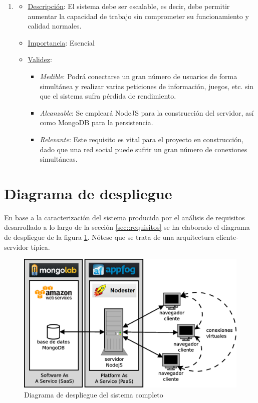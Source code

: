 \begin{enumerate}
\item %
  \begin{itemize}
  \item \underline{Descripción}: El sistema debe ser escalable, es decir, debe permitir aumentar la capacidad de trabajo sin comprometer su funcionamiento y calidad normales. 
  \item \underline{Importancia}: Esencial
  \item \underline{Validez}:
    \begin{itemize}
    \item \textit{Medible}: Podrá conectarse un gran número de usuarios de forma simultánea y realizar varias peticiones de información, juegos, etc. sin que el sistema sufra pérdida de rendimiento.
    \item \textit{Alcanzable}: Se empleará NodeJS para la construcción del servidor, así como MongoDB para la persistencia.
    \item \textit{Relevante}: Este requisito es vital para el proyecto en construcción, dado que una red social puede sufrir un gran número de conexiones simultáneas.
    \end{itemize}
  \end{itemize}

\end{enumerate}



\section{Diagrama de despliegue}
\label{sec::despliegue}

En base a la caracterización del sistema producida por el análisis de requisitos desarrollado a lo largo de la sección \ref{sec::requisitos} se ha elaborado el diagrama de despliegue de la figura \ref{fig::despliegue}. Nótese que se trata de una arquitectura cliente-servidor típica.

\begin{figure}[h]
  \begin{center}
    \includegraphics[width=\textwidth]{images/despliegue.eps}
    \caption{Diagrama de despliegue del sistema completo}
    \label{fig::despliegue}
  \end{center}
\end{figure}


